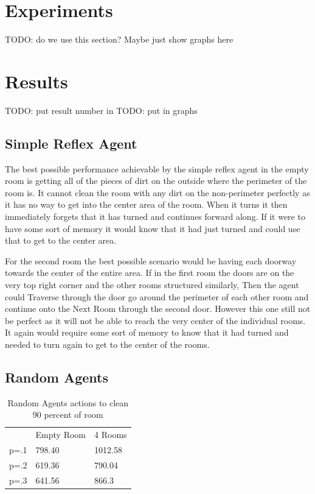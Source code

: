 \documentclass{article} %
\begin{document}
\section{Experiments}
TODO: do we use this section? Maybe just show graphs here
\section{Results}

TODO: put result number in
TODO: put in graphs

\subsection{Simple Reflex Agent}
The best possible performance achievable by the simple reflex agent in the empty room is getting all of the pieces of dirt on the outside where the perimeter of the room is. It cannot clean the room with any dirt on the non-perimeter perfectly as it has no way to get into the center area of the room. When it turns it then immediately forgets that it has turned and continues forward along. If it were to have some sort of memory it would know that it had just turned and could use that to get to the center area.

For the second room the best possible scenario would be having each doorway towards the center of the entire area. If in the first room the doors are on the very top right corner and the other rooms structured similarly, Then the agent could Traverse through the door go around the perimeter of each other room and continue onto the Next Room through the second door. However this one still not be perfect as it will not be able to reach the very center of the individual rooms. It again would require some sort of memory to know that it had turned and needed to turn again to get to the center of the rooms. 

\subsection{Random Agents}

\begin{table}[]
\centering
\caption{Random Agents actions to clean 90 percent of room}
\label{is this label used?}
\begin{tabular}{lll}
     & Empty Room & 4 Rooms \\
p=.1 & 798.40 & 1012.58 \\
p=.2 & 619.36 & 790.04  \\
p=.3 & 641.56 & 866.3  
\end{tabular}
\end{table}
\end{document}
